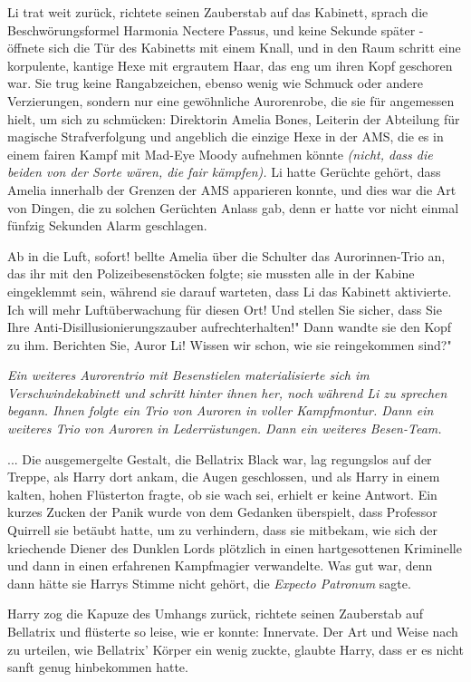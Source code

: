 Li trat weit zurück, richtete seinen Zauberstab auf das Kabinett, sprach die
Beschwörungsformel \glqq Harmonia Nectere Passus\grqq{}, und keine Sekunde
später - öffnete sich die Tür des Kabinetts mit einem Knall, und in den Raum
schritt eine korpulente, kantige Hexe mit ergrautem Haar, das eng um ihren Kopf
geschoren war. Sie trug keine Rangabzeichen, ebenso wenig wie Schmuck oder
andere Verzierungen, sondern nur eine gewöhnliche Aurorenrobe, die sie für
angemessen hielt, um sich zu schmücken: Direktorin Amelia Bones, Leiterin der
Abteilung für magische Strafverfolgung und angeblich die einzige Hexe in der
AMS, die es in einem fairen Kampf mit Mad-Eye Moody aufnehmen könnte
\emph{(nicht, dass die beiden von der Sorte wären, die fair kämpfen).} Li hatte
Gerüchte gehört, dass Amelia innerhalb der Grenzen der AMS apparieren konnte,
und dies war die Art von Dingen, die zu solchen Gerüchten Anlass gab, denn er
hatte vor nicht einmal fünfzig Sekunden Alarm geschlagen.

\glqq Ab in die Luft, sofort!\grqq{} bellte Amelia über die Schulter das
Aurorinnen-Trio an, das ihr mit den Polizeibesenstöcken folgte; sie mussten alle
in der Kabine eingeklemmt sein, während sie darauf warteten, dass Li das
Kabinett aktivierte. \glqq Ich will mehr Luftüberwachung für diesen Ort! Und
stellen Sie sicher, dass Sie Ihre Anti-Disillusionierungszauber
aufrechterhalten!" Dann wandte sie den Kopf zu ihm. \glqq Berichten Sie, Auror
Li! Wissen wir schon, wie sie reingekommen sind?"

\emph{Ein weiteres Aurorentrio mit Besenstielen materialisierte sich im Verschwindekabinett und schritt hinter ihnen her, noch während Li zu sprechen begann. Ihnen folgte ein Trio von Auroren in voller Kampfmontur. Dann ein weiteres Trio von Auroren in Lederrüstungen. Dann ein weiteres Besen-Team. }


... Die ausgemergelte Gestalt, die Bellatrix Black war, lag regungslos auf der
Treppe, als Harry dort ankam, die Augen geschlossen, und als Harry in einem
kalten, hohen Flüsterton fragte, ob sie wach sei, erhielt er keine Antwort. Ein
kurzes Zucken der Panik wurde von dem Gedanken überspielt, dass Professor
Quirrell sie betäubt hatte, um zu verhindern, dass sie mitbekam, wie sich der
kriechende Diener des Dunklen Lords plötzlich in einen hartgesottenen Kriminelle
und dann in einen erfahrenen Kampfmagier verwandelte. Was gut war, denn dann
hätte sie Harrys Stimme nicht gehört, die \emph{\glqq Expecto Patronum\grqq{}
}sagte.

Harry zog die Kapuze des Umhangs zurück, richtete seinen Zauberstab auf
Bellatrix und flüsterte so leise, wie er konnte: \glqq Innervate.\grqq{} Der Art
und Weise nach zu urteilen, wie Bellatrix' Körper ein wenig zuckte, glaubte
Harry, dass er es nicht sanft genug hinbekommen hatte.

